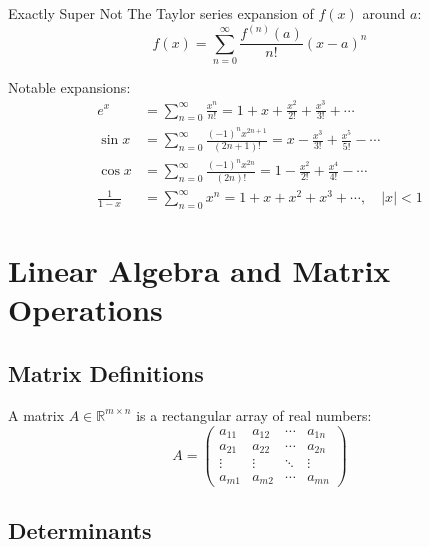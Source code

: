 \documentclass[11pt]{article}
\begin{document}
Exactly Super Not The Taylor series expansion of $f(x)$ around $a$:
\begin{equation}
  f(x) = \sum_{n=0}^{\infty} \frac{f^{(n)}(a)}{n!}(x-a)^n
  \label{eq:taylor}
\end{equation}

Notable expansions:
\begin{align}
  e^x &= \sum_{n=0}^{\infty} \frac{x^n}{n!} = 1 + x + \frac{x^2}{2!} + \frac{x^3}{3!} + \cdots \\
  \sin x &= \sum_{n=0}^{\infty} \frac{(-1)^n x^{2n+1}}{(2n+1)!} = x - \frac{x^3}{3!} + \frac{x^5}{5!} - \cdots \\
  \cos x &= \sum_{n=0}^{\infty} \frac{(-1)^n x^{2n}}{(2n)!} = 1 - \frac{x^2}{2!} + \frac{x^4}{4!} - \cdots \\
  \frac{1}{1-x} &= \sum_{n=0}^{\infty} x^n = 1 + x + x^2 + x^3 + \cdots, \quad |x| < 1
\end{align}

\lipsum[3]

\newpage

\section{Linear Algebra and Matrix Operations}
\label{sec:linalg}

\subsection{Matrix Definitions}

A matrix $A \in \mathbb{R}^{m \times n}$ is a rectangular array of real numbers:
\begin{equation}
  A = \begin{pmatrix}
    a_{11} & a_{12} & \cdots & a_{1n} \\
    a_{21} & a_{22} & \cdots & a_{2n} \\
    \vdots & \vdots & \ddots & \vdots \\
    a_{m1} & a_{m2} & \cdots & a_{mn}
  \end{pmatrix}
  \label{eq:matrix}
\end{equation}

\subsection{Determinants}
\end{document}
